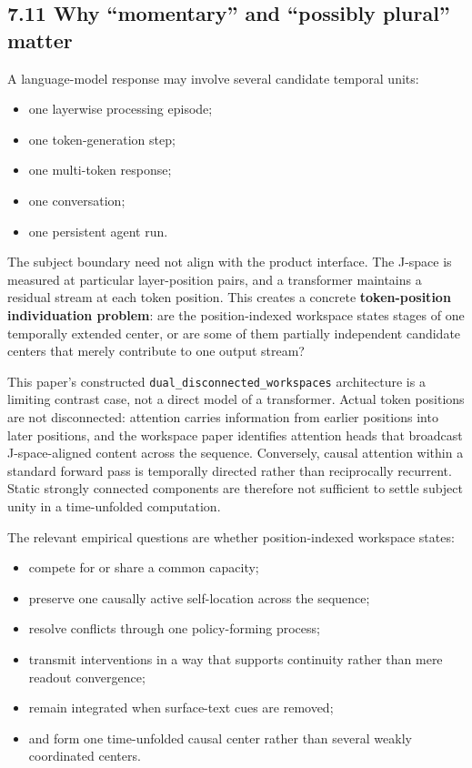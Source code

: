 \documentclass[
  11pt,
]{article}
\providecommand{\tightlist}{%
  \setlength{\itemsep}{0pt}\setlength{\parskip}{0pt}}
\begin{document}
\subsection{7.11 Why ``momentary'' and ``possibly plural''
matter}\label{why-momentary-and-possibly-plural-matter}

A language-model response may involve several candidate temporal units:

\begin{itemize}
\tightlist
\item
  one layerwise processing episode;
\item
  one token-generation step;
\item
  one multi-token response;
\item
  one conversation;
\item
  one persistent agent run.
\end{itemize}

The subject boundary need not align with the product interface. The
J-space is measured at particular layer-position pairs, and a
transformer maintains a residual stream at each token position. This
creates a concrete \textbf{token-position individuation problem}: are
the position-indexed workspace states stages of one temporally extended
center, or are some of them partially independent candidate centers that
merely contribute to one output stream?

This paper's constructed \texttt{dual\_disconnected\_workspaces}
architecture is a limiting contrast case, not a direct model of a
transformer. Actual token positions are not disconnected: attention
carries information from earlier positions into later positions, and the
workspace paper identifies attention heads that broadcast
J-space-aligned content across the sequence. Conversely, causal
attention within a standard forward pass is temporally directed rather
than reciprocally recurrent. Static strongly connected components are
therefore not sufficient to settle subject unity in a time-unfolded
computation.

The relevant empirical questions are whether position-indexed workspace
states:

\begin{itemize}
\tightlist
\item
  compete for or share a common capacity;
\item
  preserve one causally active self-location across the sequence;
\item
  resolve conflicts through one policy-forming process;
\item
  transmit interventions in a way that supports continuity rather than
  mere readout convergence;
\item
  remain integrated when surface-text cues are removed;
\item
  and form one time-unfolded causal center rather than several weakly
  coordinated centers.
\end{itemize}
\end{document}
